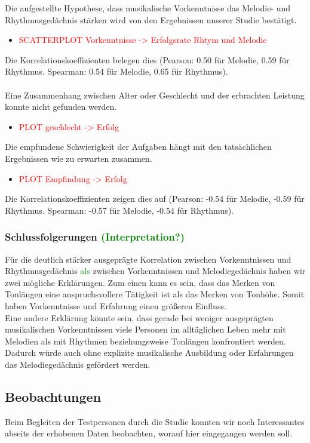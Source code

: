 \documentclass{acm_proc_article-sp}
\begin{document}
Die aufgestellte Hypothese, dass musikalische Vorkenntnisse das Melodie- und Rhythmusgedächnis stärken wird von den Ergebnissen unserer Studie bestätigt.
\begin{itemize} 
\item \textcolor{red}{SCATTERPLOT Vorkenntnisse -> Erfolgsrate Rhtym und Melodie}
\end{itemize}
Die Korrelationskoeffizienten belegen dies (Pearson: 0.50 für Melodie, 0.59 für Rhythmus. Spearman: 0.54 für Melodie, 0.65 für Rhythmus).\\\\

Eine Zusammenhang zwischen Alter oder Geschlecht und der erbrachten Leistung konnte nicht gefunden werden.
\begin{itemize} 
\item \textcolor{red}{PLOT geschlecht -> Erfolg}
\end{itemize}

Die empfundene Schwierigkeit der Aufgaben hängt mit den tatsächlichen Ergebnissen wie zu erwarten zusammen.
\begin{itemize} 
\item \textcolor{red}{PLOT Empfindung -> Erfolg}
\end{itemize}
Die Korrelationskoeffizienten zeigen dies auf (Pearson: -0.54 für Melodie, -0.59 für Rhythmus. Spearman: -0.57 für Melodie, -0.54 für Rhythmus).

\subsubsection{Schlussfolgerungen \textcolor{green}{(Interpretation?)}}
Für die deutlich stärker ausgeprägte Korrelation zwischen Vorkenntnissen und Rhythmusgedächnis \textcolor{green}{als} zwischen Vorkenntnissen und Melodiegedächnis haben wir zwei mögliche Erklärungen. Zum einen kann es sein, dass das Merken von Tonlängen eine anspruchsvollere Tätigkeit ist als das Merken von Tonhöhe. Somit haben Vorkenntnisse und Erfahrung einen größeren Einfluss. \\
Eine andere Erklärung könnte sein, dass gerade bei weniger ausgeprägten musikalischen Vorkenntnissen viele Personen im alltäglichen Leben mehr mit Melodien als mit Rhythmen beziehungsweise Tonlängen konfrontiert werden. Dadurch würde auch ohne explizite musikalische Ausbildung oder Erfahrungen das Melodiegedächnis gefördert werden.\\
\subsection{Beobachtungen}
Beim Begleiten der Testpersonen durch die Studie konnten wir noch Interessantes abseits der erhobenen Daten beobachten, worauf hier eingegangen werden soll.\\
\end{document}
